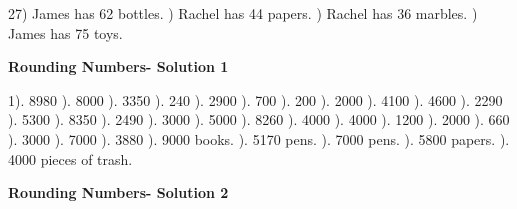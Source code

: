 \documentclass{article}%
\begin{document}
27) James has 62 bottles.%
) Rachel has 44 papers.%
) Rachel has 36 marbles.%
) James has 75 toys.%
\newline%
\newpage%
\large%
\begin{center}%
\textbf{Rounding Numbers- Solution 1}%
\newline%
\end{center} \normalsize%
1). 8980%
). 8000%
). 3350%
). 240%
). 2900%
). 700%
). 200%
). 2000%
). 4100%
). 4600%
). 2290%
). 5300%
). 8350%
). 2490%
). 3000%
). 5000%
). 8260%
). 4000%
). 4000%
). 1200%
). 2000%
). 660%
). 3000%
). 7000%
). 3880%
). 9000 books.%
). 5170 pens.%
). 7000 pens.%
). 5800 papers.%
). 4000 pieces of trash.%
\newline%
\newpage%
\large%
\begin{center}%
\textbf{Rounding Numbers- Solution 2}%
\newline%
\end{center} \normalsize%
\end{document}
